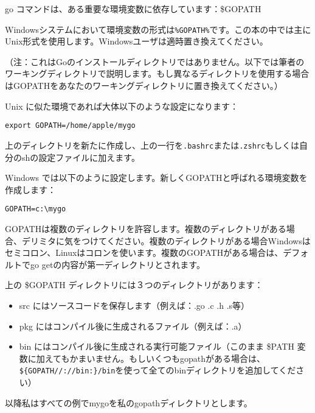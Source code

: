  go コマンドは、ある重要な環境変数に依存しています：\$GOPATH

Windowsシステムにおいて環境変数の形式は\texttt{\%GOPATH\%}です。この本の中では主にUnix形式を使用します。Windowsユーザは適時置き換えてください。

（注：これはGoのインストールディレクトリではありません。以下では筆者のワーキングディレクトリで説明します。もし異なるディレクトリを使用する場合はGOPATHをあなたのワーキングディレクトリに置き換えてください。）

Unix に似た環境であれば大体以下のような設定になります：

\begin{lstlisting}[numbers=none]
export GOPATH=/home/apple/mygo
\end{lstlisting}

 上のディレクトリを新たに作成し、上の一行を\texttt{.bashrc}または\texttt{.zshrc}もしくは自分のshの設定ファイルに加えます。

 Windows では以下のように設定します。新しくGOPATHと呼ばれる環境変数を作成します：

\begin{lstlisting}[numbers=none]
  GOPATH=c:\mygo
\end{lstlisting}

GOPATHは複数のディレクトリを許容します。複数のディレクトリがある場合、デリミタに気をつけてください。複数のディレクトリがある場合Windowsはセミコロン、Linuxはコロンを使います。複数のGOPATHがある場合は、デフォルトでgo getの内容が第一ディレクトリとされます。

上の \$GOPATH ディレクトリには３つのディレクトリがあります：

\begin{itemize}
  \item src にはソースコードを保存します（例えば：.go .c .h .s等）
  \item pkg にはコンパイル後に生成されるファイル（例えば：.a）
  \item bin にはコンパイル後に生成される実行可能ファイル（このまま \$PATH 変数に加えてもかまいません。もしいくつもgopathがある場合は、\texttt{\$\{GOPATH\//\//:\//\//bin:\}\//bin}を使って全てのbinディレクトリを追加してください）
\end{itemize}

以降私はすべての例でmygoを私のgopathディレクトリとします。
